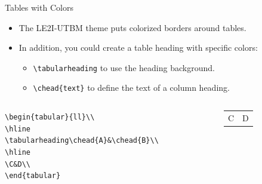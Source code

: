 \documentclass[english,sectioncirclenumberstyle]{le2iutbmbeamer}
\begin{document}
\begin{frame}{Tables with Colors}
	\begin{itemize}
	\item The LE2I-UTBM theme puts colorized borders around tables.
	\item In addition, you could create a table heading with specific colors:
		\begin{itemize}
		\item \texttt{{\textbackslash}tabularheading} to use the heading background.
		\item \texttt{{\textbackslash}chead\{text\}} to define the text of a column heading.
		\end{itemize}
	\end{itemize}
	\begin{example}
		\begin{columns}
			\begin{column}{.6\linewidth}
				\footnotesize
				\texttt{{\textbackslash}begin\{tabular\}\{{\textbar}l{\textbar}l{\textbar}\}{\textbackslash}{\textbackslash}} \\
				\texttt{{\textbackslash}hline} \\
				\texttt{{\textbackslash}tabularheading{\textbackslash}chead\{A\}\&{\textbackslash}chead\{B\}{\textbackslash}{\textbackslash}} \\
				\texttt{{\textbackslash}hline} \\
				\texttt{{\textbackslash}C\&D{\textbackslash}{\textbackslash}} \\
				\texttt{{\textbackslash}end\{tabular\}}
			\end{column}
			\begin{column}{.3\linewidth}
				\begin{tabular}{|l|l|}
					\hline
					\tabularheading\chead{A}&\chead{B} \\
					\hline
					C & D \\
					\hline
				\end{tabular}	
			\end{column}
		\end{columns}
	\end{example}
\end{frame}
\end{document}
